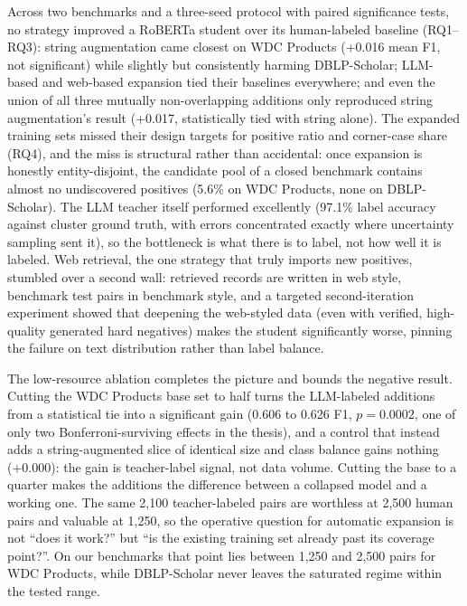 \documentclass[a4paper,oneside,bibliography=totoc]{scrbook}
\begin{document}
Across two benchmarks and a three-seed protocol with paired significance tests, no strategy improved a RoBERTa student over its human-labeled baseline (RQ1--RQ3): string augmentation came closest on WDC Products (+0.016 mean F1, not significant) while slightly but consistently harming DBLP-Scholar; LLM-based and web-based expansion tied their baselines everywhere; and even the union of all three mutually non-overlapping additions only reproduced string augmentation's result (+0.017, statistically tied with string alone). The expanded training sets missed their design targets for positive ratio and corner-case share (RQ4), and the miss is structural rather than accidental: once expansion is honestly entity-disjoint, the candidate pool of a closed benchmark contains almost no undiscovered positives (5.6\% on WDC Products, none on DBLP-Scholar). The LLM teacher itself performed excellently (97.1\% label accuracy against cluster ground truth, with errors concentrated exactly where uncertainty sampling sent it), so the bottleneck is what there is to label, not how well it is labeled. Web retrieval, the one strategy that truly imports new positives, stumbled over a second wall: retrieved records are written in web style, benchmark test pairs in benchmark style, and a targeted second-iteration experiment showed that deepening the web-styled data (even with verified, high-quality generated hard negatives) makes the student significantly worse, pinning the failure on text distribution rather than label balance.

The low-resource ablation completes the picture and bounds the negative result. Cutting the WDC Products base set to half turns the LLM-labeled additions from a statistical tie into a significant gain (0.606 to 0.626 F1, $p = 0.0002$, one of only two Bonferroni-surviving effects in the thesis), and a control that instead adds a string-augmented slice of identical size and class balance gains nothing (+0.000): the gain is teacher-label signal, not data volume. Cutting the base to a quarter makes the additions the difference between a collapsed model and a working one. The same 2{,}100 teacher-labeled pairs are worthless at 2{,}500 human pairs and valuable at 1{,}250, so the operative question for automatic expansion is not ``does it work?'' but ``is the existing training set already past its coverage point?''. On our benchmarks that point lies between 1{,}250 and 2{,}500 pairs for WDC Products, while DBLP-Scholar never leaves the saturated regime within the tested range.
\end{document}
